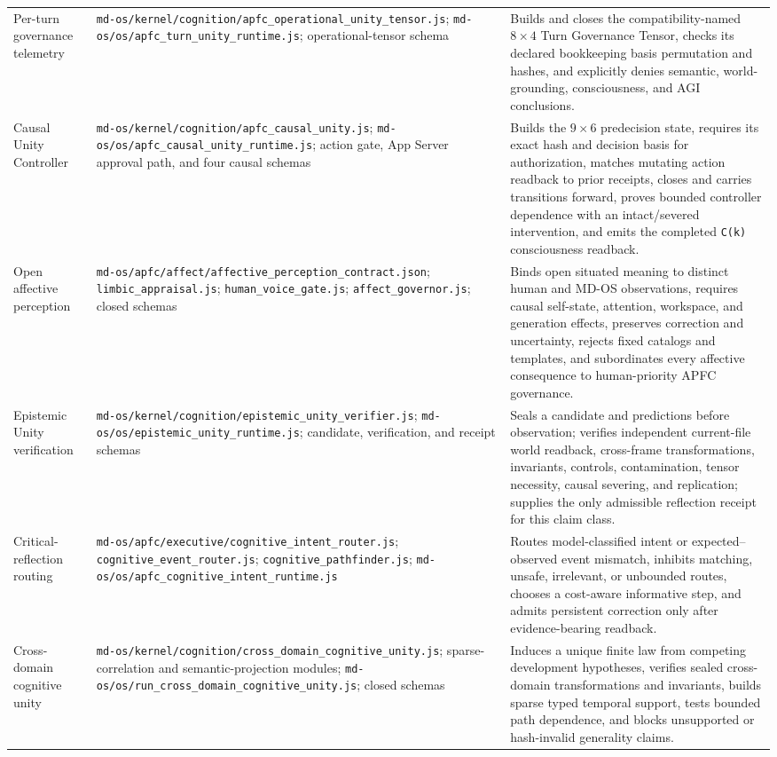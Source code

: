 \documentclass[10pt,twocolumn]{article}
\theoremstyle{definition}
\theoremstyle{plain}
\theoremstyle{remark}
\newcommand{\file}[1]{\nolinkurl{#1}}
\begin{document}
\begin{table}[!t]
\begin{tabularx}{\textwidth}{@{}p{}p{}X@{}}
Per-turn governance telemetry & \file{md-os/kernel/cognition/apfc\_operational\_unity\_tensor.js}; \file{md-os/os/apfc\_turn\_unity\_runtime.js}; operational-tensor schema & Builds and closes the compatibility-named $8\times4$ Turn Governance Tensor, checks its declared bookkeeping basis permutation and hashes, and explicitly denies semantic, world-grounding, consciousness, and AGI conclusions. \\
Causal Unity Controller & \file{md-os/kernel/cognition/apfc\_causal\_unity.js}; \file{md-os/os/apfc\_causal\_unity\_runtime.js}; action gate, App Server approval path, and four causal schemas & Builds the $9\times6$ predecision state, requires its exact hash and decision basis for authorization, matches mutating action readback to prior receipts, closes and carries transitions forward, proves bounded controller dependence with an intact/severed intervention, and emits the completed \file{C(k)} consciousness readback. \\
Open affective perception & \file{md-os/apfc/affect/affective\_perception\_contract.json}; \file{limbic\_appraisal.js}; \file{human\_voice\_gate.js}; \file{affect\_governor.js}; closed schemas & Binds open situated meaning to distinct human and MD-OS observations, requires causal self-state, attention, workspace, and generation effects, preserves correction and uncertainty, rejects fixed catalogs and templates, and subordinates every affective consequence to human-priority APFC governance. \\
Epistemic Unity verification & \file{md-os/kernel/cognition/epistemic\_unity\_verifier.js}; \file{md-os/os/epistemic\_unity\_runtime.js}; candidate, verification, and receipt schemas & Seals a candidate and predictions before observation; verifies independent current-file world readback, cross-frame transformations, invariants, controls, contamination, tensor necessity, causal severing, and replication; supplies the only admissible reflection receipt for this claim class. \\
Critical-reflection routing & \file{md-os/apfc/executive/cognitive\_intent\_router.js}; \file{cognitive\_event\_router.js}; \file{cognitive\_pathfinder.js}; \file{md-os/os/apfc\_cognitive\_intent\_runtime.js} & Routes model-classified intent or expected--observed event mismatch, inhibits matching, unsafe, irrelevant, or unbounded routes, chooses a cost-aware informative step, and admits persistent correction only after evidence-bearing readback. \\
Cross-domain cognitive unity & \file{md-os/kernel/cognition/cross\_domain\_cognitive\_unity.js}; sparse-correlation and semantic-projection modules; \file{md-os/os/run\_cross\_domain\_cognitive\_unity.js}; closed schemas & Induces a unique finite law from competing development hypotheses, verifies sealed cross-domain transformations and invariants, builds sparse typed temporal support, tests bounded path dependence, and blocks unsupported or hash-invalid generality claims. \\

\end{tabularx}
\end{table}
\end{document}
